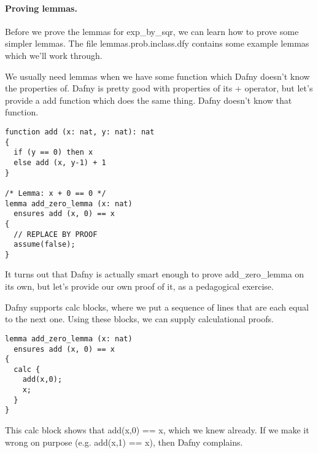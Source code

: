 \documentclass[11pt]{article}
\begin{document}
\paragraph{Proving lemmas.} Before we prove the lemmas for \textsf{exp\_by\_sqr}, we can learn how to prove some simpler
lemmas. The file \textsf{lemmas.prob.inclass.dfy} contains some example lemmas which we'll work through.

We usually need lemmas when we have some function which Dafny doesn't know the properties of.
Dafny is pretty good with properties of its \textsf{+} operator, but let's provide a \textsf{add}
function which does the same thing. Dafny doesn't know that function.
\begin{lstlisting}[language=dafny]
function add (x: nat, y: nat): nat
{
  if (y == 0) then x
  else add (x, y-1) + 1
}

/* Lemma: x + 0 == 0 */
lemma add_zero_lemma (x: nat)
  ensures add (x, 0) == x
{
  // REPLACE BY PROOF
  assume(false);
}
\end{lstlisting}
It turns out that Dafny is actually smart enough to prove \textsf{add\_zero\_lemma} on its own,
but let's provide our own proof of it, as a pedagogical exercise.

Dafny supports \textsf{calc} blocks, where we put a sequence of lines that are each equal to the next one.
Using these blocks, we can supply calculational proofs.
\begin{lstlisting}[language=dafny]
lemma add_zero_lemma (x: nat)
  ensures add (x, 0) == x
{
  calc {
    add(x,0);
    x;
  }
}
\end{lstlisting}
This \textsf{calc} block shows that \textsf{add(x,0) == x}, which we knew already. If we make it wrong on purpose
(e.g. \textsf{add(x,1) == x}), then Dafny complains.
\end{document}
